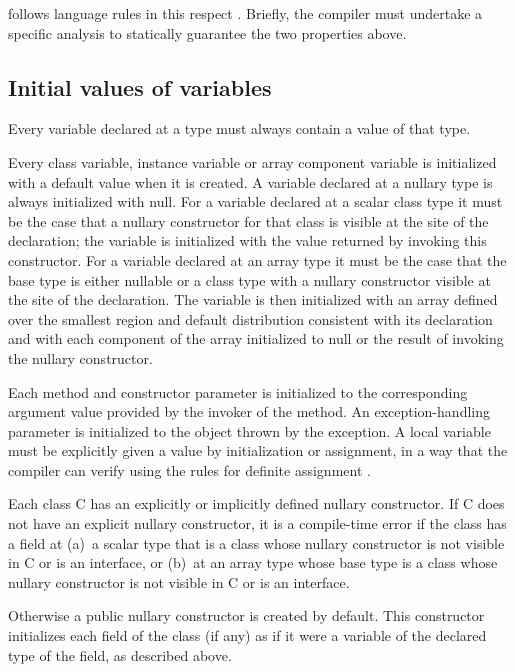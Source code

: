 \Xten{} follows \java{} language rules in this respect \cite[\S
4.5.4,8.3.1.2,16]{jls2}. Briefly, the compiler must undertake a
specific analysis to statically guarantee the two properties above.


\subsection{Initial values of variables}
\label{NullaryConstructor}
Every variable declared at a type must always contain a value of that type.

Every class variable, instance variable or array component variable is
initialized with a default value when it is created.  A variable
declared at a nullary type is always initialized with {\cf null}. For
a variable declared at a scalar class type it must be the case that a
nullary constructor for that class is visible at the site of the
declaration; the variable is initialized with the value returned by
invoking this constructor. For a variable declared at an array type it
must be the case that the base type is either nullable or a class type
with a nullary constructor visible at the site of the declaration. The
variable is then initialized with an array defined over the smallest
region and default distribution consistent with its declaration and
with each component of the array initialized to {\cf null} or the
result of invoking the nullary constructor.

Each method and constructor parameter is initialized to the
corresponding argument value provided by the invoker of the method. An
exception-handling parameter is initialized to the object thrown by
the exception. A local variable must be explicitly given a value by
initialization or assignment, in a way that the compiler can verify
using the rules for definite assignment \cite[\S~16]{jls2}.

Each class {\cf C} has an explicitly or implicitly defined nullary
constructor. If {\cf C} does not have an explicit nullary
constructor, it is a compile-time error if the class has a field at (a)~a
scalar type that is a {\cf class} whose nullary constructor is not
visible in {\cf C} or is an {\cf interface}, or (b)~at an array type whose
base type is a {\cf class} whose nullary constructor is not visible in
{\cf C} or is an {\cf interface}.

Otherwise a {\cf public} nullary constructor is created by
default. This constructor initializes each field of the class (if any)
as if it were a variable of the declared type of the field, as
described above.


